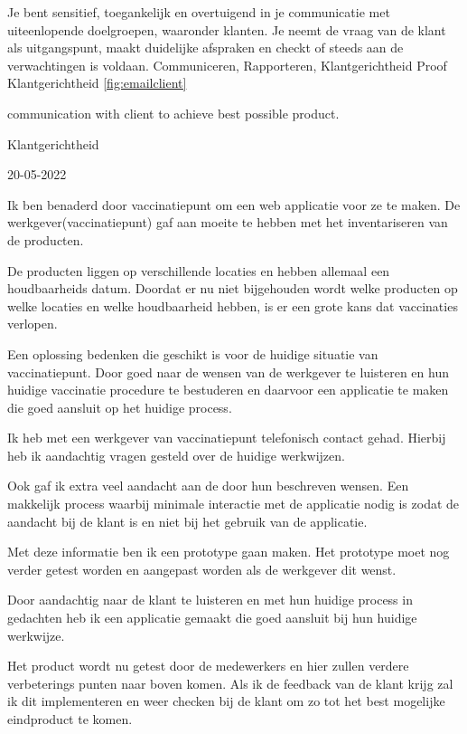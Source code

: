 \competentie
{%
	\competentieformulier
	{%
		Je bent sensitief, toegankelijk en overtuigend in je
		communicatie met uiteenlopende doelgroepen,
		waaronder klanten. Je neemt de vraag van de klant als
		uitgangspunt, maakt duidelijke afspraken en checkt of
		steeds aan de verwachtingen is voldaan.
	}
	{%
		Communiceren,
		Rapporteren,%
		Klantgerichtheid%
	}
	{%
		Proof
	}
	{%
		Klantgerichtheid
	}
	{%
		\ref{fig:emailclient}
	}
}
{%
	\bewijs
	{%
		communication with client to achieve best possible product.
	}
	{%
		\starr
		{%

			Klantgerichtheid
		}
		{%
			20-05-2022
		}
		{%
			Ik ben benaderd door vaccinatiepunt om een web applicatie voor ze te maken.
			De werkgever(vaccinatiepunt) gaf aan moeite te hebben met het inventariseren van de producten.

			De producten liggen op verschillende locaties en hebben allemaal een houdbaarheids datum.
			Doordat er  nu niet bijgehouden wordt welke producten op welke locaties en welke houdbaarheid hebben, is er een grote kans dat vaccinaties verlopen.
		}
		{%
			Een oplossing bedenken die geschikt is voor de huidige situatie van vaccinatiepunt.
			Door goed naar de wensen van de werkgever te luisteren en hun huidige vaccinatie procedure te bestuderen en daarvoor een applicatie te maken die goed aansluit op het huidige process.

		}
		{%
			Ik heb met een werkgever van vaccinatiepunt telefonisch contact gehad.
			Hierbij heb ik aandachtig vragen gesteld over de huidige werkwijzen.

			Ook gaf ik extra veel aandacht aan de door hun beschreven wensen.
			Een makkelijk process waarbij minimale interactie met de applicatie nodig is zodat de aandacht bij de klant is en niet bij het gebruik van de applicatie.

			Met deze informatie ben ik een prototype gaan maken.
			Het prototype moet nog verder getest worden en aangepast worden als de werkgever dit wenst.
		}
		{%
			Door aandachtig naar de klant te luisteren en met hun huidige process in gedachten heb ik een applicatie gemaakt die goed aansluit bij hun huidige werkwijze.

			Het product wordt nu getest door de medewerkers en hier zullen verdere verbeterings punten naar boven komen.
			Als ik de feedback van de klant krijg zal ik dit implementeren en weer checken bij de klant om zo tot het best mogelijke eindproduct te komen.

}}}
